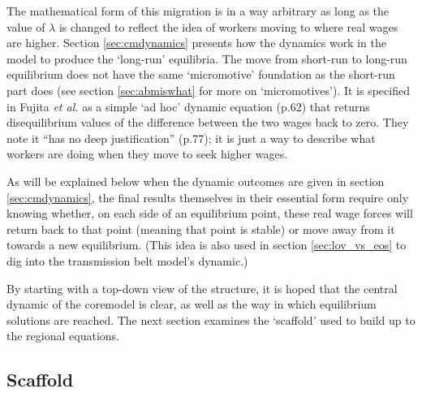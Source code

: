 The mathematical form of this migration is in a way arbitrary as long as the value of $\lambda$ is changed to reflect the idea of workers moving to where real wages are higher. Section \ref{sec:cmdynamics} presents how the dynamics work in the model to produce the `long-run' equilibria. The move from short-run to long-run equilibrium does not have the same `micromotive' foundation as the short-run part does (see section \ref{sec:abmiswhat} for more on `micromotives'). It is specified in Fujita \emph{et al.} as a simple `ad hoc' dynamic equation (p.62) that returns disequilibrium values of the difference between the two wages back to zero. They note it ``has no deep justification'' (p.77); it is just a way to describe what workers are doing when they move to seek higher wages. 

As will be explained below when the dynamic outcomes are given in section \ref{sec:cmdynamics}, the final results themselves in their essential form require only knowing whether, on each side of an equilibrium point, these real wage forces will return back to that point (meaning that point is stable) or move away from it towards a new equilibrium. (This idea is also used in section \ref{sec:lov_vs_eos} to dig into the transmission belt model's dynamic.)

By starting with a top-down view of the structure, it is hoped that the central dynamic of the \gls{coremodel} is clear, as well as the way in which equilibrium solutions are reached. The next section examines the `scaffold' used to build up to the regional equations. 

\subsection{Scaffold \label{sec:cmscaffold}}

